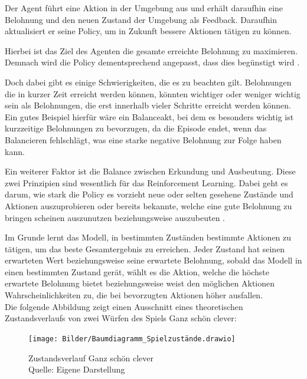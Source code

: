 Der Agent führt eine Aktion in der Umgebung aus und erhält daraufhin eine Belohnung und den neuen Zustand der Umgebung als Feedback. Daraufhin aktualisiert er seine Policy, um in Zukunft bessere Aktionen tätigen zu können.

Hierbei ist das Ziel des Agenten die gesamte erreichte Belohnung zu maximieren. Demnach wird die Policy dementsprechend angepasst, dass dies begünstigt wird \cite[Seite 12f]{ris-ala_fundamentals_2023}.

Doch dabei gibt es einige Schwierigkeiten, die es zu beachten gilt. Belohnungen die in kurzer Zeit erreicht werden können, könnten wichtiger oder weniger wichtig sein als Belohnungen, die erst innerhalb vieler Schritte erreicht werden können. Ein gutes Beispiel hierfür wäre ein Balanceakt, bei dem es besonders wichtig ist kurzzeitige Belohnungen zu bevorzugen, da die Episode endet, wenn das Balancieren fehlschlägt, was eine starke negative Belohnung zur Folge haben kann.

Ein weiterer Faktor ist die Balance zwischen Erkundung und Ausbeutung. Diese zwei Prinzipien sind wesentlich für das Reinforcement Learning. Dabei geht es darum, wie stark die Policy es vorzieht neue oder selten gesehene Zustände und Aktionen auszuprobieren oder bereits bekannte, welche eine gute Belohnung zu bringen scheinen auszunutzen beziehungsweise auszubeuten \cite[Seite 13]{ris-ala_fundamentals_2023}.

Im Grunde lernt das Modell, in bestimmten Zuständen bestimmte Aktionen zu tätigen, um das beste Gesamtergebnis zu erreichen. Jeder Zustand hat seinen erwarteten Wert beziehungsweise seine erwartete Belohnung, sobald das Modell in einen bestimmten Zustand gerät, wählt es die Aktion, welche die höchste erwartete Belohnung bietet beziehungsweise weist den möglichen Aktionen Wahrscheinlichkeiten zu, die bei bevorzugten Aktionen höher ausfallen.\\

Die folgende Abbildung zeigt einen Ausschnitt eines theoretischen Zustandsverlaufs von zwei Würfen des Spiels Ganz schön clever:
\nopagebreak
\begin{figure}[h]
	\texttt{[image: Bilder/Baumdiagramm\_Spielzustände.drawio]} 
	\caption[Zustandsverlauf Ganz schön clever]{Zustandsverlauf Ganz schön clever\\ Quelle: Eigene Darstellung}
\end{figure}	

